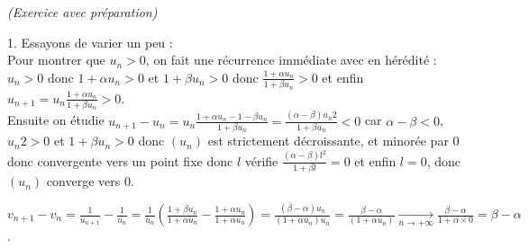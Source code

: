 \documentclass[11pt]{article}%
\begin{document}
\begin{exercice}{\it (Exercice avec préparation)}
\begin{noliste}{1.}
Essayons de varier un peu : \\
 Pour montrer que $u_{n} >0$, on fait une récurrence immédiate avec en
hérédité : \\
 $u_{n} >0$ donc $ 1 + \alpha u_{n} > 0$ et $1 + \beta u_{n} > 0$ donc
$\frac{1 + \alpha u_{n}}{1 + \beta u_{n}} > 0$ et enfin $u_{n + 1} =
u_{n} \frac{1 + \alpha u_{n}}{1 + \beta u_{n}} > 0$. \\
 Ensuite on étudie $u_{n + 1} - u_{n} = u_{n} \frac{1 + \alpha u_{n} -
1 - \beta u_{n}}{1 + \beta u_{n}} = \frac{ (\alpha - \beta )
u_{n}{2}}{1 + \beta u_{n}} < 0$ car $\alpha - \beta <0$, $u_{n}{2} >0$
et $1 + \beta u_{n} >0$ donc $(u_{n})$ est strictement décroissante, et
minorée par 0 donc convergente vers un point fixe donc $l$ vérifie
$\frac{(\alpha - \beta) l^{2}}{1 + \beta l} = 0$ et enfin $l = 0$, donc
$(u_{n})$ converge vers 0. \\

 \item $v_{n + 1} - v_{n} = \frac{1}{u_{n + 1} } - \frac{1}{u_{n}} =
\frac{1}{u_{n}} \left( \frac{ 1 + \beta u_{n}}{1 + \alpha u_{n}} -
\frac{1 + \alpha u_{n}}{1 + \alpha u_{n}} \right) = \frac{ (\beta -
\alpha) u_{n} }{ (1 + \alpha u_{n}) u_{n}} = \frac{ \beta - \alpha }{
(1 + \alpha u_{n})} \xrightarrow[n \rightarrow + \infty]{} \frac{ \beta
- \alpha}{ 1 + \alpha \times 0} = \beta - \alpha$. \\


\end{noliste}
\end{exercice}
\end{document}
